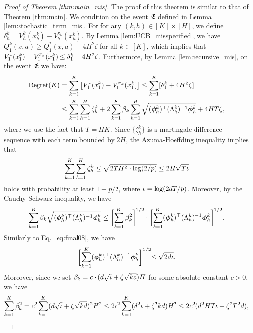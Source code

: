 \begin{proof}[Proof of Theorem \ref{thm:main_mis}]
	The proof of this theorem is similar to that of  Theorem \ref{thm:main}. 
	We condition on the event  $\mathfrak{E}$ defined in Lemma \ref{lem:stochastic_term_mis}.
	For for any $(k,h) \in [K]\times [H]$, 
	we define $\delta^k_h = V^k_h(x^{k}_{h}) - V^{\pi_k}_h(x^{k}_{h})$.   
	By Lemma \ref{lem:UCB_misspecified}, we have 
	$Q_1^k (x,a) \geq Q_1^*(x,a ) -4H^2  \zeta $ for all $k\in [K]$, which implies that ${V}^{\star}_{1} ({x}^{k}_{1}) - {V}^{\pi_k}_{1} ({x}^{k}_{1}) \leq \delta_1^k + 4H^2  \zeta$.
	Furthermore, by  Lemma \ref{lem:recursive_mis}, on the event $\mathfrak{E}$ we have:
\begin{align}\label{eq:mis1}
\text{Regret}(K) & =  \sum_{k=1}^{K} \left[{V}^{\star}_{1} ({x}^{k}_{1}) - {V}^{\pi_k}_{1} ({x}^{k}_{1})\right]
\le \sum_{k=1}^{K} [ \delta^k_1 + 4H^2 \zeta] \nonumber \\
& \le \sum_{k=1}^{K}\sum_{h=1}^H  \zeta^k_{h} + 2\sum_{k=1}^{K}\beta_k\sum_{h=1}^H \sqrt{(\bm{\phi}^{k}_h)^{\top} (\Lambda^k_h)^{-1}  \bm{\phi}^{k}_h}
+ 4HT\zeta,
\end{align}
where we use the fact that $T = HK$.
Since $\{ \zeta^k_{h} \}$  is a   martingale difference sequence with each term bounded by $2H$,
 the Azuma-Hoeffding inequality implies that 
 \begin{equation}\label{eq:mis2}
 \sum_{k=1}^{K}\sum_{h=1}^H  \zeta^k_{h}  \leq  \sqrt{2 T H^2 \cdot \log ( 2 / p)} \leq 2 H  \sqrt{ T\iota}
 \end{equation} 
 holds with  probability at least $1 -p / 2$, where $\iota = \log (2dT/p)$. 
 Moreover, by the Cauchy-Schwarz inequality, we have 
 \begin{equation}
 \label{eq:mis3}
  \sum_{k=1}^{K} \beta_k  \sqrt{(\bm{\phi}^{k}_h)^{\top} (\Lambda^k_h)^{-1}  \bm{\phi}^{k}_h}   \leq \biggl [ \sum_{k=1}^K \beta_k^2 \biggr ] ^{1/2} \cdot \biggl [ \sum_{k=1}^K (\bm{\phi}^{k}_h)^{\top} (\Lambda^k_h)^{-1}  \bm{\phi}^{k}_h \biggl] ^{1/2 }  . 
 \end{equation}
Similarly to Eq.~\eqref{eq:final08}, we have 
\begin{equation}
\label{eq:mis4}
 \biggl [ \sum_{k=1}^K (\bm{\phi}^{k}_h)^{\top} (\Lambda^k_h)^{-1}  \bm{\phi}^{k}_h \biggl] ^{1/2 }  \leq \sqrt{ 2 d \iota}. 
\end{equation}
 Moreover, since we set  $ \beta_k = c \cdot (d\sqrt{\iota} + \zeta\sqrt{kd})H  $ for some absolute constant $c>0$, we have 
 \begin{equation*}
 \sum_{k=1}^K \beta_k^2  =  c^2 \sum_{k=1}^K (d\sqrt{\logt} +  \zeta\sqrt{kd}) ^2  H^2  \leq 2 c^2 \sum_{k=1}^K  ( d^2\logt + \zeta^2 k d) H^2  \le 2c^2(d^2HT\logt + \zeta^2T^2d),

\end{equation*}
\end{proof}

